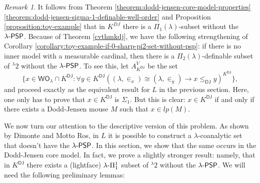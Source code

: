 \documentclass{amsart}
\numberwithin{equation}{section}
\def\hyp{{\hbox{-}}}
\theoremstyle{definition}
\theoremstyle{remark}
\newtheorem{remark}[theorem]{Remark}
\begin{document}
\begin{remark}
 It follows from Theorem \ref{theorem:dodd-jensen-core-model-properties}\ref{theorem:dodd-jensen-sigma-1-definable-well-order} and Proposition \ref{proposition:toy-example} that in $K^{DJ}$ there is a $\Pi_1(\lambda)$-subset without the $\lambda\hyp\mathsf{PSP}$. Because of Theorem \ref{cvthmkdj}, we have the following strengthening of Corollary \ref{corollary:toy-example-if-0-sharp-pi2-set-without-psp}: if there is no inner model with a measurable cardinal, then there is a $\Pi_2(\lambda)$-definable subset of ${}^{\lambda}2$ without the $\lambda\hyp\mathsf{PSP}$. To see this, let $A^{V}_{K^{\mathsf{DJ}}}$ be the set $$\{x\in \mathsf{WO}_{\lambda}\cap K^{\mathsf{DJ}}:\forall y\in K^{\mathsf{DJ}}((\lambda,\in_{x})\cong(\lambda,\in_{y})\rightarrow x\leq_{{\mathsf{DJ}}}y)^{K^{\mathsf{DJ}}}\},$$
and proceed exactly as the equivalent result for $L$ in the previous section. Here, one only has to prove that $x\in K^{\mathsf{DJ}}$ is $\Sigma_1$. But this is clear: $x\in K^{\mathsf{DJ}}$ if and only if there exists a Dodd-Jensen mouse $M$ such that $x\in lp(M)$.
\end{remark}

We now turn our attention to the descriptive version of this problem. As shown by Dimonte and Motto Ros, in $L$ it is possible to construct a $\lambda$-coanalytic set that doesn't have the $\lambda\hyp\mathsf{PSP}$. 
In this section, we show that the same occurs in the Dodd-Jensen core model. In fact, we prove a slightly stronger result: namely, that in $K^{\mathsf{DJ}}$ there exists a (lightface) $\lambda\hyp\Pi^1_1$ subset of ${}^{\lambda}2$ without the $\lambda\hyp\mathsf{PSP}$. We will need the following preliminary lemmas:
\end{document}
